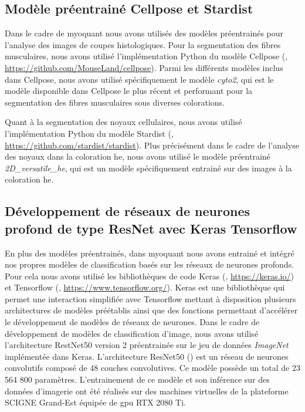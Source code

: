 \subsection{Modèle préentrainé Cellpose et Stardist}
Dans le cadre de \gls{myoquant} nous avons utilisés des modèles préentrainés pour l'analyse des images de coupes histologiques. Pour la segmentation des fibres musculaires, nous avons utilisé l'implémentation Python du modèle Cellpose (\cite{stringer_cellpose_2021}, \url{https://github.com/MouseLand/cellpose}). Parmi les différents modèles inclus dans Cellpose, nous avons utilisé spécifiquement le modèle \textit{cyto2}, qui est le modèle disponible dans Cellpose le plus récent et performant pour la segmentation des fibres musculaires sous diverses colorations. 

Quant à la segmentation des noyaux cellulaires, nous avons utilisé l'implémentation Python du modèle Stardist (\cite{weigert_star-convex_2020}, \url{https://github.com/stardist/stardist}). Plus précisément dans le cadre de l'analyse des noyaux dans la coloration \gls{he}, nous avons utilisé le modèle préentrainé \textit{2D\_versatile\_he}, qui est un modèle spécifiquement entrainé sur des images à la coloration \gls{he}.

\subsection{Développement de réseaux de neurones profond de type ResNet avec Keras Tensorflow}
En plus des modèles préentrainés, dans \gls{myoquant} nous avons entrainé et intégré nos propres modèles de classification basés sur les réseaux de neurones profonds. Pour cela nous avons utilisé les bibliothèques de code Keras (\cite{chollet_keras_2015}, \url{https://keras.io/}) et Tensorflow (\cite{martin_abadi_tensorflow_2015}, \url{https://www.tensorflow.org/}). Keras est une bibliothèque qui permet une interaction simplifiée avec Tensorflow mettant à disposition plusieurs architectures de modèles préétablis ainsi que des fonctions permettant d'accélérer le développement de modèles de réseaux de neurones. Dans le cadre de développement de modèles de classification d'image, nous avons utilisé l'architecture RestNet50 version 2 préentrainée sur le jeu de données \textit{ImageNet} implémentée dans Keras. L'architecture ResNet50 (\cite{he_deep_2015}) est un réseau de neurones convolutifs composé de 48 couches convolutives. Ce modèle possède un total de 23 564 800 paramètres. L'entrainement de ce modèle et son inférence sur des données d'imagerie ont été réalisés sur des machines virtuelles de la plateforme SCIGNE Grand-Est équipée de \gls{gpu} RTX 2080 Ti.

